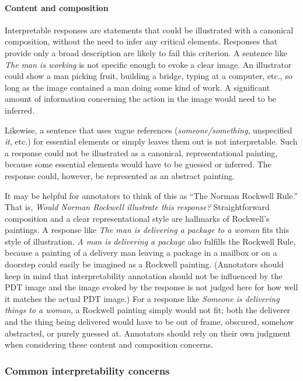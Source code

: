 \documentclass[12pt]{article}
\begin{document}
\paragraph{Content and composition} Interpretable responses are statements that could be illustrated with a canonical composition, without the need to infer any critical elements. Responses that provide only a broad description are likely to fail this criterion. A sentence like \textit{The man is working} is not specific enough to evoke a clear image. An illustrator could show a man picking fruit, building a bridge, typing at a computer, etc., so long as the image contained a man doing some kind of work. A significant amount of information concerning the action in the image would need to be inferred.

Likewise, a sentence that uses vague references (\textit{someone/something}, unspecified \textit{it}, etc.) for essential elements or simply leaves them out is not interpretable. Such a response could not be illustrated as a canonical, representational painting, because some essential elements would have to be guessed or inferred. The response could, however, be represented as an abstract painting. 

It may be helpful for annotators to think of this as ``The Norman Rockwell Rule.'' That is, \textit{Would Norman Rockwell illustrate this response?} Straightforward composition and a clear representational style are hallmarks of Rockwell's paintings. A response like \textit{The man is delivering a package to a woman} fits this style of illustration. \textit{A man is delivering a package} also fulfills the Rockwell Rule, because a painting of a delivery man leaving a package in a mailbox or on a doorstep could easily be imagined as a Rockwell painting. (Annotators should keep in mind that interpretability annotation should not be influenced by the PDT image and the image evoked by the response is not judged here for how well it matches the actual PDT image.) For a response like \textit{Someone is delivering things to a woman}, a Rockwell painting simply would not fit; both the deliverer and the thing being delivered would have to be out of frame, obscured, somehow abstracted, or purely guessed at. Annotators should rely on their own judgment when considering these content and composition concerns.

\subsubsection{Common interpretability concerns}
\end{document}
